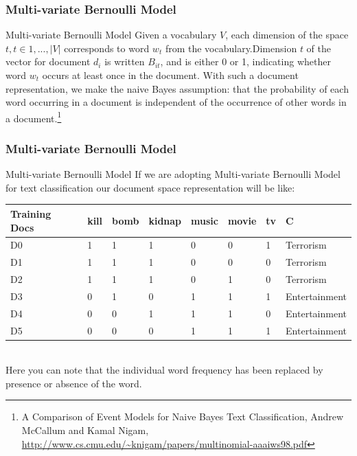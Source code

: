\documentclass[serif,11pt,aspectratio=1610,table]{beamer}
\begin{document}
\begin{frame}[fragile]
 \frametitle{Multi-variate Bernoulli Model}
\begin{block}{Multi-variate Bernoulli Model}
 Given a vocabulary $V$, each dimension of the space $t,t \in {1,...,|V|}$ corresponds to word $w_{t}$ from the vocabulary.Dimension $t$ of the vector for document $d_{i}$ is written $B_{it}$, and is either 0 or 1, indicating whether word $w_{t}$ occurs at least once in the document. With such a document representation, we make the naive Bayes assumption: that the probability of each word occurring in a document is independent of the occurrence of other words in a document.\footnote{A Comparison of Event Models for Naive Bayes Text Classification, Andrew McCallum and Kamal Nigam, \url{http://www.cs.cmu.edu/~knigam/papers/multinomial-aaaiws98.pdf}}
\end{block}

\end{frame}

\begin{frame}[fragile]
 \frametitle{Multi-variate Bernoulli Model}
\begin{block}{Multi-variate Bernoulli Model}
 If we are adopting Multi-variate Bernoulli Model for text classification our document space representation will be like:
\footnotesize
\begin{tabular}{|l|l|l|l|l|l|l|l|}
  \hline
  Training Docs & kill & bomb & kidnap & music & movie & tv & C \\ \hline
  D0 & 1 & 1 & 1 & 0 & 0 & 1 & Terrorism \\ \hline
  D1 & 1 & 1 & 1 & 0 & 0 & 0 & Terrorism \\ \hline
  D2 & 1 & 1 & 1 & 0 & 1 & 0 & Terrorism \\ \hline
  D3 & 0 & 1 & 0 & 1 & 1 & 1 & Entertainment \\ \hline
  D4 & 0 & 0 & 1 & 1 & 1 & 0 & Entertainment \\ \hline
  D5 & 0 & 0 & 0 & 1 & 1 & 1 & Entertainment \\
  \hline
  \end{tabular} \\
\small
Here you can note that the individual word frequency has been replaced by presence or absence of the word.
\end{block}

\end{frame}
\end{document}
